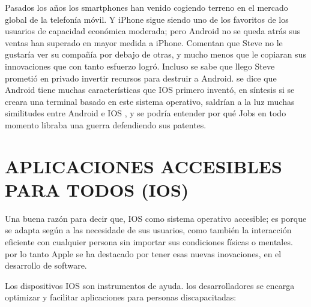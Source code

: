Pasados los años los smartphones han venido cogiendo terreno
en el mercado global de la telefonía móvil. Y iPhone sigue siendo
uno de los favoritos de los usuarios de capacidad económica
moderada; pero Android no se queda atrás sus ventas han
superado en mayor medida a iPhone. Comentan que Steve no le
gustaría ver su compañía por debajo de otras, y mucho menos
que le copiaran sus innovaciones que con tanto esfuerzo logró.
Incluso se sabe que llego Steve prometió en privado invertir
recursos para destruir a Android. se dice que Android tiene
muchas características que IOS primero inventó, en síntesis si
se creara una terminal basado en este sistema operativo,
saldrían a la luz muchas similitudes entre Android e IOS , y se
podría entender por qué Jobs en todo momento libraba una
guerra defendiendo sus patentes.

\section*{APLICACIONES ACCESIBLES PARA TODOS (IOS)}
Una buena razón para decir que, IOS como sistema operativo
accesible; es porque se adapta según a las necesidade de sus
usuarios, como también la interacción eficiente con cualquier
persona sin importar sus condiciones físicas o mentales. por lo
tanto Apple se ha destacado por tener esas nuevas inovaciones,
en el desarrollo de software.

Los dispositivos IOS son instrumentos de ayuda. los
desarrolladores se encarga optimizar y facilitar aplicaciones
para personas discapacitadas:

